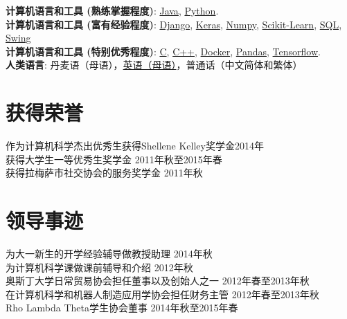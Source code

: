 \documentclass[margin]{res}
\begin{document}
\begin{CJK*}{UTF8}{gbsn}
\begin{resume}
\textbf{计算机语言和工具 (熟练掌握程度)}: \href{http://www.lucaskjaero.com/projects/tech/java/}{Java}, \href{http://www.lucaskjaero.com/projects/tech/python/}{Python}.
\\
\textbf{计算机语言和工具 (富有经验程度)}: \href{http://www.lucaskjaero.com/projects/tech/django/}{Django}, \href{http://www.lucaskjaero.com/projects/tech/keras/}{Keras}, \href{http://www.lucaskjaero.com/projects/tech/numpy/}{Numpy}, \href{http://www.lucaskjaero.com/projects/tech/sklearn/}{Scikit-Learn}, \href{http://www.lucaskjaero.com/projects/tech/postgresql/}{SQL}, \href{http://www.lucaskjaero.com/projects/tech/swing/}{Swing}
\\
\textbf{计算机语言和工具 (特别优秀程度)}: \href{http://www.lucaskjaero.com/projects/tech/c/}{C}, \href{http://www.lucaskjaero.com/projects/tech/cplusplus/}{C++}, \href{http://www.lucaskjaero.com/projects/tech/docker/}{Docker}, \href{http://www.lucaskjaero.com/projects/tech/pandas/}{Pandas}, \href{http://www.lucaskjaero.com/projects/tech/tensorflow/}{Tensorflow}.
\\
\textbf{人类语言}: 丹麦语（母语），\href{https://www.lucaskjaerozhang.com/lucas-kjaero-zhang-resume.pdf}{英语（母语）}，普通话（中文简体和繁体）


\section{获得荣誉}
作为计算机科学杰出优秀生获得Shellene Kelley奖学金\hfill 2014年\\
获得大学生一等优秀生奖学金 \hfill 2011年秋至2015年春\\
获得拉梅萨市社交协会的服务奖学金 \hfill 2011年秋

\section{领导事迹}
为大一新生的开学经验辅导做教授助理 \hfill 2014年秋\\
为计算机科学课做课前辅导和介绍 \hfill 2012年秋\\
奥斯丁大学日常贸易协会担任董事以及创始人之一 \hfill 2012年春至2013年秋\\
在计算机科学和机器人制造应用学协会担任财务主管 \hfill 2012年春至2013年秋\\
Rho Lambda Theta学生协会董事 \hfill 2014年秋至2015年春


\end{resume}
\end{CJK*}
\end{document}
